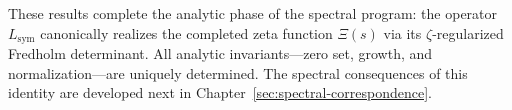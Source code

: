 \medskip
\noindent
These results complete the analytic phase of the spectral program: the operator \( L_{\mathrm{sym}} \) canonically realizes the completed zeta function \( \Xi(s) \) via its \(\zeta\)-regularized Fredholm determinant. All analytic invariants—zero set, growth, and normalization—are uniquely determined. The spectral consequences of this identity are developed next in Chapter~\ref{sec:spectral-correspondence}.
% 
